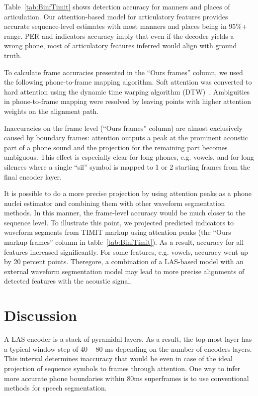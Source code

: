 \documentclass[a4paper]{article}
\begin{document}
Table~\ref{tab:BinfTimit} shows detection accuracy for manners and places of articulation.
Our attention-based model for articulatory features provides accurate sequence-level estimates with most manners and places being in 95\%+ range. PER and indicators accuracy imply that even if the decoder yields a wrong phone, most of articulatory features inferred would align with ground truth.

To calculate frame accuracies presented in the ``Ours frames'' column, we used the following phone-to-frame mapping algorithm. Soft attention was converted to hard attention using the dynamic time warping algorithm (DTW)~\cite{Salvador-2007}. Ambiguities in phone-to-frame mapping were resolved by leaving points with higher attention weights on the alignment path.

Inaccuracies on the frame level (``Ours frames'' column) are almost exclusively caused by boundary frames: attention outputs a peak at the prominent acoustic part of a phone sound and the projection for the remaining part becomes ambiguous. This effect is especially clear for long phones, e.g. vowels, and for long silences where a single ``sil'' symbol is mapped to 1 or 2 starting frames from the final encoder layer.

It is possible to do a more precise projection by using attention peaks as a phone nuclei estimator and combining them with other waveform segmentation methods. In this manner, the frame-level accuracy would be much closer to the sequence level. To illustrate this point, we projected predicted indicators to waveform segments from TIMIT markup using attention peaks (the ``Ours markup frames'' column in table~\ref{tab:BinfTimit}). As a result, accuracy for all features increased significantly. For some features, e.g. vowels, accuracy went up by 20 percent points. Theregore, a combination of a LAS-based model with an external waveform segmentation model may lead to more precise alignments of detected features with the acoustic signal.

\section{Discussion}
A LAS encoder is a stack of pyramidal layers. As a result, the top-most layer has a typical window step of 40 -- 80 ms depending on the number of encoders layers. This interval determines inaccuracy that would be even in case of the ideal projection of sequence symbols to frames through attention. One way to infer more accurate phone boundaries within 80ms superframes is to use conventional methods for speech segmentation.
\end{document}
